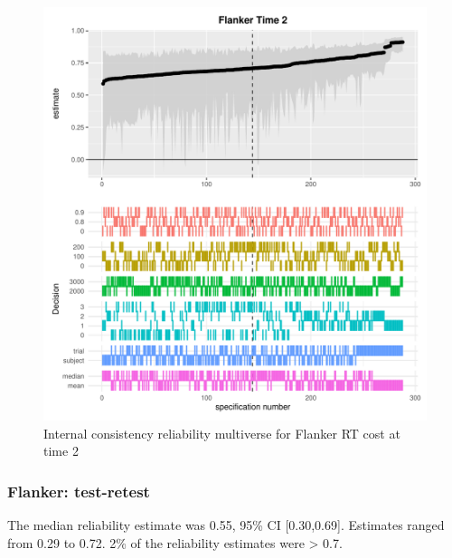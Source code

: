 \documentclass[
  english,
  man,floatsintext]{apa6}
\begin{document}
\begin{figure}
\centering
\includegraphics{Reliability_Multiverse_files/figure-latex/unnamed-chunk-9-1.pdf}
\caption{\label{fig:unnamed-chunk-9}Internal consistency reliability multiverse for Flanker RT cost at time 2}
\end{figure}

\newpage

\hypertarget{flanker-test-retest}{%
\subsubsection{Flanker: test-retest}\label{flanker-test-retest}}

The median reliability estimate was 0.55, 95\% CI {[}0.30,0.69{]}. Estimates ranged from 0.29 to 0.72. 2\% of the reliability estimates were \textgreater{} 0.7.
\end{document}
